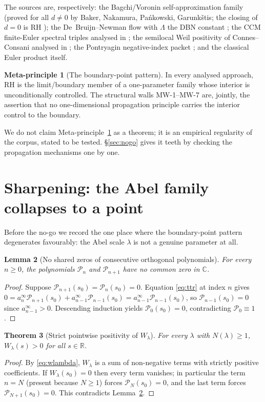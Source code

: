 \documentclass[11pt]{amsart}
\newtheorem{theorem}{Theorem}[section]
\newtheorem{lemma}[theorem]{Lemma}
\theoremstyle{definition}
\newtheorem{principle}[theorem]{Meta-principle}
\theoremstyle{remark}
\newcommand{\bbR}{\mathbb{R}}
\newcommand{\bbC}{\mathbb{C}}
\newcommand{\Wl}{W_\lambda}
\begin{document}
The sources are, respectively: the Bagchi/Voronin self-approximation
family (proved for all $d\neq0$ by Baker, Nakamura, Pa\'nkowski,
Garunk\v{s}tis; the closing of $d=0$ is RH \cite[]{P40}); the
De~Bruijn--Newman flow with $\Lambda$ the DBN constant
\cite[Docs~70--71]{P40}; the CCM finite-Euler spectral triples
\cite{CCM25} analysed in \cite[]{P40}; the semilocal Weil
positivity of Connes--Consani \cite{CC21} analysed in \cite[]{P40};
the Pontryagin negative-index packet \cite[]{P40}; and the classical
Euler product itself.

\begin{principle}[The boundary-point pattern]\label{prin:boundary}\sloppy
In every analysed approach, RH is the limit/boundary member of a
one-parameter family whose interior is unconditionally controlled. The
structural walls MW-1--MW-7 are, jointly, the assertion that no
one-dimensional propagation principle carries the interior control to the
boundary.
\end{principle}

We do not claim Meta-principle~\ref{prin:boundary} as a theorem; it is an
empirical regularity of the corpus, stated to be tested. \S\ref{sec:nogo}
gives it teeth by checking the propagation mechanisms one by one.

\section{Sharpening: the Abel family collapses to a point}\label{sec:wlambda}

Before the no-go we record the one place where the boundary-point pattern
degenerates favourably: the Abel scale $\lambda$ is not a genuine
parameter at all.

\begin{lemma}[No shared zeros of consecutive orthogonal polynomials]\label{lem:noshared}
For every $n\geq0$, the polynomials $\mathcal{P}_n$ and $\mathcal{P}_{n+1}$
have no common zero in $\bbC$.
\end{lemma}
\begin{proof}
Suppose $\mathcal{P}_{n+1}(s_0)=\mathcal{P}_n(s_0)=0$. Equation
\eqref{eq:ttr} at index $n$ gives
$0=a_n^\infty\mathcal{P}_{n+1}(s_0)+a_{n-1}^\infty\mathcal{P}_{n-1}(s_0)
=a_{n-1}^\infty\mathcal{P}_{n-1}(s_0)$, so $\mathcal{P}_{n-1}(s_0)=0$ since
$a_{n-1}^\infty>0$. Descending induction yields
$\mathcal{P}_0(s_0)=0$, contradicting $\mathcal{P}_0\equiv1$.
\end{proof}

\begin{theorem}[Strict pointwise positivity of $\Wl$]\label{thm:wlambda-strict}
For every $\lambda$ with $N(\lambda)\geq1$, $\Wl(s)>0$ for all $s\in\bbR$.
\end{theorem}
\begin{proof}
By \eqref{eq:wlambda}, $\Wl$ is a sum of non-negative terms with strictly
positive coefficients. If $\Wl(s_0)=0$ then every term vanishes; in
particular the term $n=N$ (present because $N\geq1$) forces
$\mathcal{P}_N(s_0)=0$, and the last term forces
$\mathcal{P}_{N+1}(s_0)=0$. This contradicts Lemma~\ref{lem:noshared}.
\end{proof}
\end{document}
